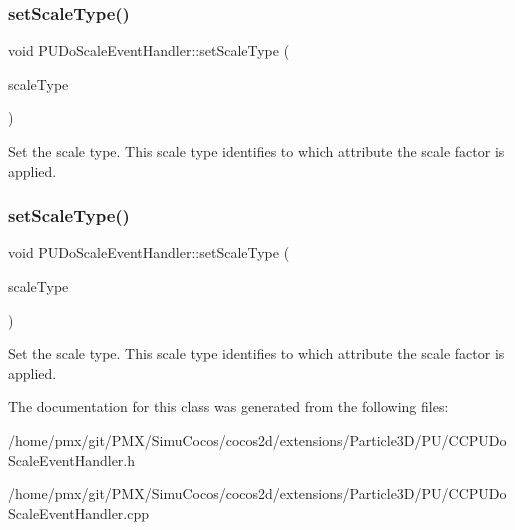 \subsubsection{\texorpdfstring{set\+Scale\+Type()}{setScaleType()}\hspace{0.1cm}{\footnotesize\ttfamily [1/2]}}
{\footnotesize\ttfamily void P\+U\+Do\+Scale\+Event\+Handler\+::set\+Scale\+Type (\begin{DoxyParamCaption}\item[{const Scale\+Type \&}]{scale\+Type }\end{DoxyParamCaption})}

Set the scale type. This scale type identifies to which attribute the scale factor is applied. \mbox{\label{classPUDoScaleEventHandler_a6e53868333c76e91eb38d608bc2e06b9}} 
\subsubsection{\texorpdfstring{set\+Scale\+Type()}{setScaleType()}\hspace{0.1cm}{\footnotesize\ttfamily [2/2]}}
{\footnotesize\ttfamily void P\+U\+Do\+Scale\+Event\+Handler\+::set\+Scale\+Type (\begin{DoxyParamCaption}\item[{const Scale\+Type \&}]{scale\+Type }\end{DoxyParamCaption})}

Set the scale type. This scale type identifies to which attribute the scale factor is applied. 

The documentation for this class was generated from the following files\+:\begin{DoxyCompactItemize}
\item 
/home/pmx/git/\+P\+M\+X/\+Simu\+Cocos/cocos2d/extensions/\+Particle3\+D/\+P\+U/C\+C\+P\+U\+Do\+Scale\+Event\+Handler.\+h\item 
/home/pmx/git/\+P\+M\+X/\+Simu\+Cocos/cocos2d/extensions/\+Particle3\+D/\+P\+U/C\+C\+P\+U\+Do\+Scale\+Event\+Handler.\+cpp\end{DoxyCompactItemize}
